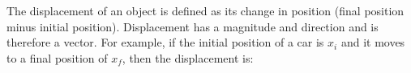       \label{m38788*id63003}The displacement of an object is defined as its change in position (final position minus initial position). Displacement has a magnitude and direction and is therefore a vector. For example, if the initial position of a car is \begin{math}{x}_{i}\end{math} and it moves to a final position of \begin{math}{x}_{f}\end{math}, then the displacement is:\par 
      \label{m38788*id63035}\nopagebreak\noindent{}
    
